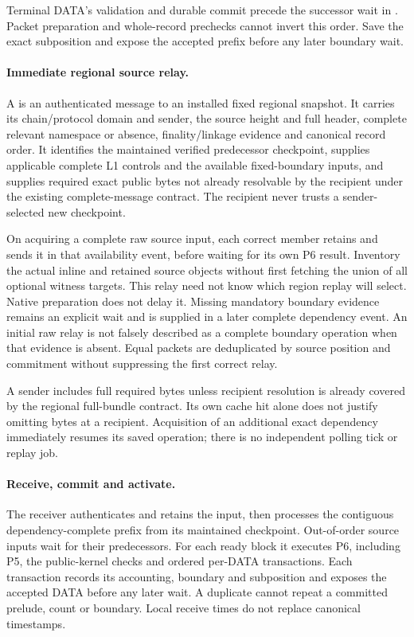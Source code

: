 Terminal DATA's validation and durable commit precede the successor
wait in . Packet preparation and whole-record
prechecks cannot invert this order. Save the exact subposition and
expose the accepted prefix before any later boundary wait.

\paragraph{Immediate regional source relay.}
A  is an authenticated message to an installed fixed
regional snapshot. It carries its chain/protocol domain and sender,
the source height and full header, complete relevant namespace or
absence, finality/linkage evidence and canonical record order. It
identifies the maintained verified predecessor checkpoint, supplies
applicable complete L1 controls and the available fixed-boundary
inputs, and supplies required exact public bytes not already resolvable
by the recipient under the existing complete-message contract. The
recipient never trusts a sender-selected new checkpoint.

On acquiring a complete raw source input, each correct member retains
and sends it in that availability event, before waiting for its own P6
result. Inventory the actual inline and retained source objects without
first fetching the union of all optional witness targets. This relay
need not know which region replay will select. Native preparation does
not delay it. Missing mandatory boundary evidence remains an explicit
wait and is supplied in a later complete dependency event. An initial
raw relay is not falsely described as a complete boundary operation
when that evidence is absent. Equal packets are deduplicated by source
position and commitment without suppressing the first correct relay.

A sender includes full required bytes unless recipient resolution is
already covered by the regional full-bundle contract. Its own cache hit
alone does not justify omitting bytes at a recipient. Acquisition of an
additional exact dependency immediately resumes its saved operation;
there is no independent polling tick or replay job.

\paragraph{Receive, commit and activate.}
The receiver authenticates and retains the input, then processes the
contiguous dependency-complete prefix from its maintained checkpoint.
Out-of-order source inputs wait for their predecessors. For each ready
block it executes P6, including P5, the public-kernel checks and ordered
per-DATA transactions. Each transaction records its accounting,
boundary and subposition and exposes the accepted DATA before any
later wait. A duplicate cannot repeat a committed prelude, count or
boundary. Local receive times do not replace canonical timestamps.

